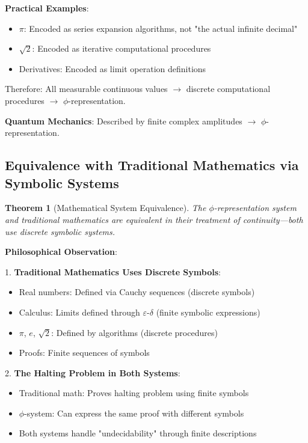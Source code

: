 \documentclass[12pt,letterpaper]{article}
\newtheorem{theorem}{Theorem}[section]
\begin{document}
\textbf{Practical Examples}:
\begin{itemize}
\item $\pi$: Encoded as series expansion algorithms, not "the actual infinite decimal"
\item $\sqrt{2}$: Encoded as iterative computational procedures
\item Derivatives: Encoded as limit operation definitions
\end{itemize}

Therefore: All measurable continuous values $\to$ discrete computational procedures $\to$ $\phi$-representation.

\textbf{Quantum Mechanics}: Described by finite complex amplitudes $\to$ $\phi$-representation.

\subsection{Equivalence with Traditional Mathematics via Symbolic Systems}

\begin{theorem}[Mathematical System Equivalence]
The $\phi$-representation system and traditional mathematics are equivalent in their treatment of continuity—both use discrete symbolic systems.
\end{theorem}

\textbf{Philosophical Observation}:

1. \textbf{Traditional Mathematics Uses Discrete Symbols}:
   \begin{itemize}
   \item Real numbers: Defined via Cauchy sequences (discrete symbols)
   \item Calculus: Limits defined through $\varepsilon$-$\delta$ (finite symbolic expressions)
   \item $\pi$, $e$, $\sqrt{2}$: Defined by algorithms (discrete procedures)
   \item Proofs: Finite sequences of symbols
   \end{itemize}

2. \textbf{The Halting Problem in Both Systems}:
   \begin{itemize}
   \item Traditional math: Proves halting problem using finite symbols
   \item $\phi$-system: Can express the same proof with different symbols
   \item Both systems handle "undecidability" through finite descriptions
   \end{itemize}
\end{document}
